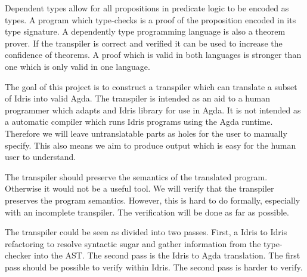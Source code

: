 Dependent types allow for all propositions in predicate logic to be encoded as
types. A program which type-checks is a proof of the proposition encoded in
its type signature. A dependently type programming language is also a theorem
prover. If the transpiler is correct and verified it can be used to increase
the confidence of theorems. A proof which is valid in both languages is
stronger than one which is only valid in one language.


The goal of this project is to construct a transpiler which can translate
a subset of Idris into valid Agda. The transpiler is intended as an aid to
a human programmer which adapts and Idris library for use in Agda.  It is not
intended as a automatic compiler which runs Idris programs using the Agda
runtime. Therefore we will leave untranslatable parts as holes for the user to
manually specify. This also means we aim to produce output which is easy for
the human user to understand.



The transpiler should preserve the semantics of the translated program.
Otherwise it would not be a useful tool.  We will verify that the transpiler
preserves the program semantics.  However, this is hard to do formally,
especially with an incomplete transpiler.  The verification will be done as far
as possible.


The transpiler could be seen as divided into two passes. First, a Idris to
Idris refactoring to resolve syntactic sugar and gather information from the
type-checker into the AST. The second pass is the Idris to Agda translation.
The first pass should be possible to verify within Idris. The second pass is
harder to verify.



